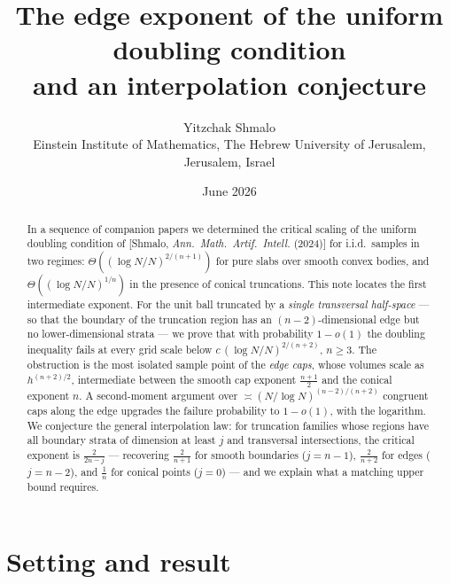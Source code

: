 \documentclass[11pt]{article}
\title{The edge exponent of the uniform doubling condition\\
and an interpolation conjecture}
\author{Yitzchak Shmalo\\
\small Einstein Institute of Mathematics, The Hebrew University of Jerusalem, Jerusalem, Israel\\
\small }
\date{June 2026}
\begin{document}
\maketitle

\begin{abstract}
In a sequence of companion papers we determined the critical scaling of the
uniform doubling condition of
[Shmalo, \emph{Ann.\ Math.\ Artif.\ Intell.} (2024)] for i.i.d.\ samples in
two regimes: $\Theta((\log N/N)^{2/(n+1)})$ for pure slabs over smooth convex
bodies, and $\Theta((\log N/N)^{1/n})$ in the presence of conical truncations.
This note locates the first intermediate exponent.  For the unit ball
truncated by a \emph{single transversal half-space} --- so that the boundary
of the truncation region has an $(n-2)$-dimensional edge but no
lower-dimensional strata --- we prove that with probability $1-o(1)$ the
doubling inequality fails at every grid scale below
$c\,(\log N/N)^{2/(n+2)}$, $n\ge3$.  The obstruction is the most isolated
sample point of the \emph{edge caps}, whose volumes scale as
$h^{(n+2)/2}$, intermediate between the smooth cap exponent
$\frac{n+1}2$ and the conical exponent $n$.  A second-moment argument over
$\asymp(N/\log N)^{(n-2)/(n+2)}$ congruent caps along the edge upgrades the
failure probability to $1-o(1)$, with the logarithm.  We conjecture the general
interpolation law: for truncation families whose regions have all boundary
strata of dimension at least $j$ and transversal intersections, the critical
exponent is $\frac{2}{2n-j}$ --- recovering
$\frac{2}{n+1}$ for smooth boundaries ($j=n-1$), $\frac{2}{n+2}$ for edges
($j=n-2$), and $\frac1n$ for conical points ($j=0$) --- and we explain what a
matching upper bound requires.
\end{abstract}

\section{Setting and result}\label{sec:intro}
\end{document}
